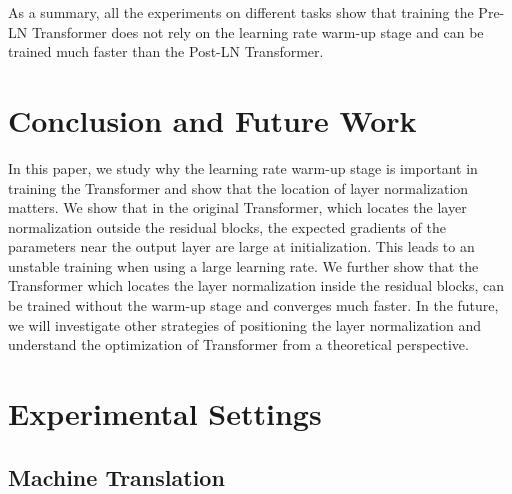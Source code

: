 \documentclass{article}
\begin{document}
As a summary, all the experiments on different tasks show that training the Pre-LN Transformer does not rely on the learning rate warm-up stage and can be trained much faster than the Post-LN Transformer.

\section{Conclusion and Future Work}
In this paper, we study why the learning rate warm-up stage is important in training the Transformer and show that the location of layer normalization matters. We show that in the original Transformer, which locates the layer normalization outside the residual blocks, the expected gradients of the parameters near the output layer are large at initialization. This leads to an unstable training when using a large learning rate. We further show that the Transformer which locates the layer normalization inside the residual blocks, can be trained without the warm-up stage and converges much faster. In the future, we will investigate other strategies of positioning the layer normalization and understand the optimization of Transformer from a theoretical perspective. 





\appendix

\section{Experimental Settings}

\subsection{Machine Translation}
\end{document}
